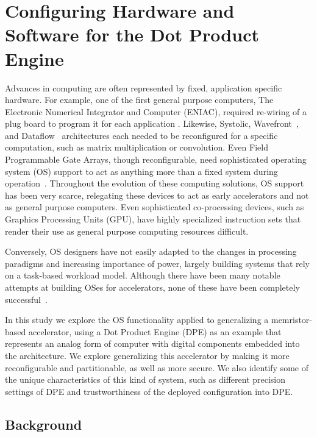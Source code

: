 \section{Configuring Hardware and Software for the Dot Product Engine}
\label{sec:configDPE}

Advances in computing are often represented by fixed, application specific
hardware. For example, one of the first general purpose computers, The
Electronic Numerical Integrator and Computer (ENIAC), required re-wiring of a
plug board to program it for each application \cite{goldstine1946electronic}.
Likewise, Systolic, Wavefront~\cite{kung1984supercomputing}, and
Dataflow~\cite{iannucci1988toward} architectures each needed to be reconfigured
for a specific computation, such as matrix multiplication or convolution.  Even
Field Programmable Gate Arrays, though reconfigurable, need sophisticated
operating system (OS) support to act as anything more than a fixed system
during operation~\cite{so2006improving}.  Throughout the evolution of these
computing solutions, OS support has been very scarce, relegating these devices
to act as early accelerators and not as general purpose computers.  Even
sophisticated co-processing devices, such as Graphics Processing Units (GPU),
have highly specialized instruction sets that render their use as general
purpose computing resources difficult.

Conversely, OS designers have not easily adapted to the changes in processing
paradigms and increasing importance of power,
largely building systems that rely on a task-based workload model. Although
there have been many notable attempts at building OSes for accelerators, none
of these have been completely successful~\cite{laplante2016rethinking}.

In this study we explore the OS functionality applied to generalizing a
memristor-based accelerator, using a Dot Product Engine (DPE) as an example
that represents an analog form of computer with digital components embedded
into the architecture.  We explore generalizing this accelerator by making it
more reconfigurable and partitionable, as well as more secure.  We also
identify some of the unique characteristics of this kind of system, such as
different precision settings of DPE and trustworthiness of the deployed
configuration into DPE.

\subsection{Background}

